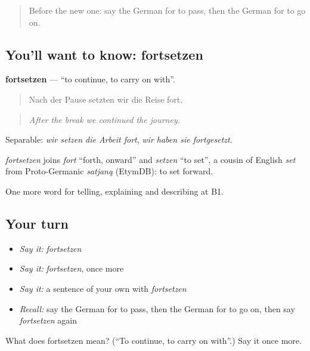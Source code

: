 \begin{quote}
Before the new one: say the German for to pass, then the German for to go on.
\end{quote}

\subsection*{You'll want to know: fortsetzen}
\textbf{fortsetzen} — \textquotedblleft{}to continue, to carry on with\textquotedblright{}.

\begin{quote}
Nach der Pause setzten wir die Reise fort.
\end{quote}

\begin{quote}
\emph{After the break we continued the journey.}
\end{quote}

Separable: \emph{wir setzen die Arbeit fort}, \emph{wir haben sie fortgesetzt}.

\begin{cousinweb}
\emph{fortsetzen} joins \emph{fort} \textquotedblleft{}forth, onward\textquotedblright{} and \emph{setzen} \textquotedblleft{}to set\textquotedblright{}, a cousin of English \emph{set} from Proto-Germanic \emph{satjaną} (EtymDB): to set forward.
\end{cousinweb}

\begin{grammarlens}[title={What you've built}]
One more word for telling, explaining and describing at B1.
\end{grammarlens}

\subsection*{Your turn}
\begin{itemize}
\raggedright
  \item \emph{Say it:} \emph{fortsetzen}
  \item \emph{Say it:} \emph{fortsetzen}, once more
  \item \emph{Say it:} a sentence of your own with \emph{fortsetzen}
  \item \emph{Recall:} say the German for to pass, then the German for to go on, then say \emph{fortsetzen} again
\end{itemize}

\begin{tcolorbox}[breakable,colback=teal!4,colframe=teal!35!black,title={Before you move on}]
What does fortsetzen mean? (\textquotedblleft{}To continue, to carry on with\textquotedblright{}.) Say it once more.
\end{tcolorbox}
